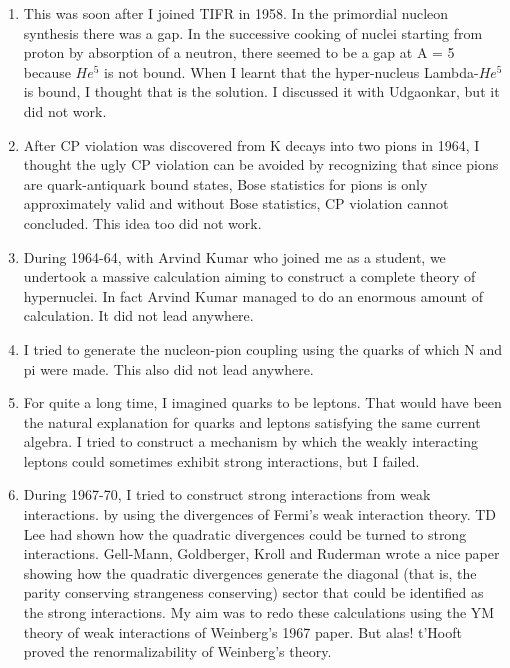 \begin{enumerate}
\itemsep=0pt
\item This was soon after I joined TIFR in 1958. In the primordial nucleon 
synthesis there was a gap. In the successive cooking of nuclei starting 
from proton by absorption of a neutron, there seemed to be a gap at A = 
5 because $He^5$ is not bound. When I learnt that the hyper-nucleus 
Lambda-$He^5$ is bound, I thought that is the solution. I discussed it 
with Udgaonkar, but it did not work.
\item After CP violation was discovered from K decays into two pions in 
1964, I thought the ugly CP violation can be avoi\-ded by recognizing that 
since pions are quark-antiquark bound states, Bose statistics for pions 
is only approxima\-tely valid and without Bose statistics, CP violation 
cannot concluded. This idea too did not work.
\item During 1964-64, with Arvind Kumar who joined me as a student, we 
undertook a massive calculation aiming to co\-nstruct a complete theory of 
hypernuclei. In fact Arvind Kumar managed to do an enormous amount of 
calculation. It did not lead anywhere.
\item I tried to generate the nucleon-pion coupling using the quarks of 
which N and pi were made. This also did not lead anywhere.
\item For quite a long time, I imagined quarks to be leptons. That would have 
been the natural explanation for quarks and leptons satisfying the same 
current algebra. I tried to construct a mechanism by which the weakly 
interacting leptons could sometimes exhibit strong interactions, but I 
failed.
\item During 1967-70, I tried to construct strong interactions fr\-om weak 
interactions. by using the divergences of Fermi's weak interaction 
theory. TD Lee had shown how the qua\-dratic divergences could be turned 
to strong interactions. Gell-Mann, Goldberger, Kroll and Ruderman wrote 
a nice paper showing how the quadratic divergences generate the diagonal 
(that is, the parity conserving strangeness conserving) sector that 
could be identified as the strong interactions. My aim was to redo these 
calculations usi\-ng the YM theory of weak interactions of Weinberg's 1967 
paper. But alas! t'Hooft proved the renormalizability of Weinberg's 
theory.
\end{enumerate}

\vspace{-\topsep}
